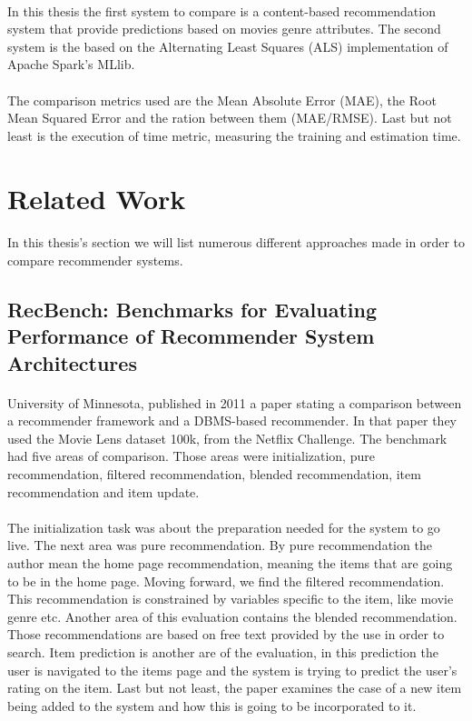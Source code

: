 \paragraph{} In this thesis the first system to compare is a content-based recommendation system that provide predictions based on movies genre attributes. The second system is the based on the Alternating Least Squares (ALS) implementation of Apache Spark's MLlib.

\paragraph{} The comparison metrics used are the Mean Absolute Error (MAE), the Root Mean Squared Error and the ration between them (MAE/RMSE). Last but not least is the execution of time metric, measuring the training and estimation time.

\section{Related Work}
\paragraph{} In this thesis's section we will list numerous different approaches made in order to compare recommender systems.

\subsection{RecBench: Benchmarks for Evaluating Performance of Recommender System Architectures \cite{levandoski2011recbench}}
\paragraph{}University of Minnesota, published in 2011 a paper stating a comparison between a recommender framework and a DBMS-based recommender. In that paper they used the Movie Lens dataset 100k, from the Netflix Challenge. The benchmark had five areas of comparison. Those areas were initialization, pure recommendation, filtered recommendation, blended recommendation, item recommendation and item update.

\paragraph{}The initialization task was about the preparation needed for the system to go live. The next area was pure recommendation. By pure recommendation the author mean the home page recommendation, meaning the items that are going to be in the home page. Moving forward, we find the filtered recommendation. This recommendation is constrained by variables specific to the item, like movie genre etc. Another area of this evaluation contains the blended recommendation. Those recommendations are based on free text provided by the use in order to search. Item prediction is another are of the evaluation, in this prediction the user is navigated to the items page and the system is trying to predict the user's rating on the item. Last but not least, the paper examines the case of a new item being added to the system and how this is going to be incorporated to it.

